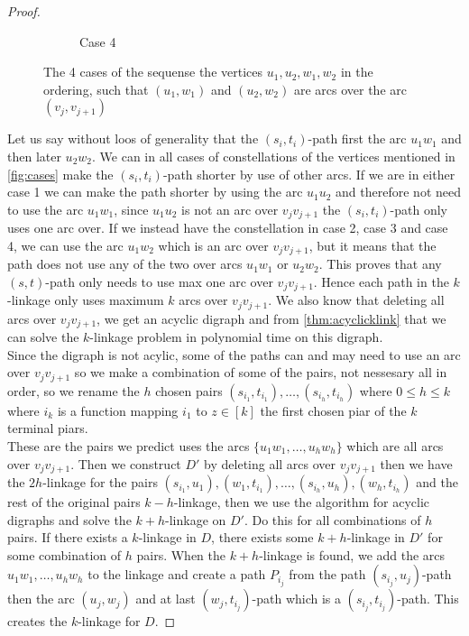 \begin{proof}
\begin{figure}
\begin{subfigure}[b]{0.49\textwidth}
            \caption{Case 4}
        \end{subfigure}
        \caption{The 4 cases of the sequense the vertices $u_1,u_2,w_1,w_2$ in the ordering, such that $(u_1,w_1)$ and $(u_2,w_2)$ are arcs over the arc $(v_j,v_{j+1})$}
        \label{fig:cases}
        \end{figure}
    Let us say without loos of generality that the $(s_i,t_i)$-path first the arc $u_1w_1$ and then later $u_2w_2$.
    We can in all cases of constellations of the vertices mentioned in \autoref{fig:cases} make the $(s_i,t_i)$-path shorter by use of other arcs. 
    If we are in either case 1 we can make the path shorter by using the arc $u_1u_2$ and therefore not need to use the arc $u_1w_1$, since $u_1u_2$ is not an arc over $v_jv_{j+1}$ the $(s_i,t_i)$-path only uses one arc over.
    If we instead have the constellation in case 2, case 3 and case 4, we can use the arc $u_1w_2$ which is an arc over $v_jv_{j+1}$, but it means that the path does not use any of the two over arcs $u_1w_1$ or $u_2w_2$. 
    This proves that any $(s,t)$-path only needs to use max one arc over $v_jv_{j+1}$.
    Hence each path in the $k$-linkage only uses maximum $k$ arcs over $v_jv_{j+1}$.
    We also know that deleting all arcs over $v_jv_{j+1}$, we get an acyclic digraph and from \autoref{thm:acyclicklink} that we can solve the $k$-linkage problem in polynomial time on this digraph.\\
    Since the digraph is not acylic, some of the paths can and may need to use an arc over $v_jv_{j+1}$ so we make a combination of some of the pairs, not nessesary all in order, so we rename the $h$ chosen pairs $(s_{i_1},t_{i_1}),\dots ,(s_{i_h},t_{i_h})$ where $0\leq h\leq k$ where $i_k$ is a function mapping $i_1$ to $z\in [k]$ the first chosen piar of the $k$ terminal piars. \\
    These are the pairs we predict uses the arcs $\lbrace u_1w_1,\dots ,u_hw_h\rbrace$ which are all arcs over $v_jv_{j+1}$.
    Then we construct $D'$ by deleting all arcs over $v_jv_{j+1}$ then we have the $2h$-linkage for the pairs $(s_{i_1},u_1),(w_1,t_{i_1}),\dots ,(s_{i_h},u_h),(w_h,t_{i_h})$ and the rest of the original pairs $k-h$-linkage, then we use the algorithm for acyclic digraphs and solve the $k+h$-linkage on $D'$. Do this for all combinations of $h$ pairs. 
    If there exists a $k$-linkage in $D$, there exists some $k+h$-linkage in $D'$ for some combination of $h$ pairs.
    When the $k+h$-linkage is found, we add the arcs $u_1w_1,\dots , u_hw_h$ to the linkage and create a path $P_{i_j}$ from the path $(s_{i_j},u_j)$-path then the arc $(u_j,w_j)$ and at last  $(w_j,t_{i_j})$-path which is a $(s_{i_j},t_{i_j})$-path.
    This creates the $k$-linkage for $D$. 
\end{proof}
